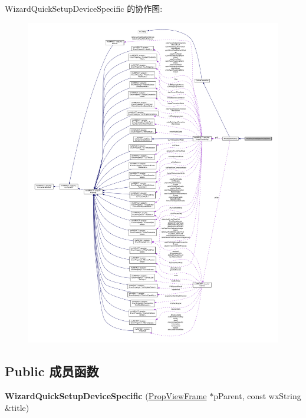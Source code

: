 Wizard\+Quick\+Setup\+Device\+Specific 的协作图\+:
\nopagebreak
\begin{figure}[H]
\begin{center}
\leavevmode
\includegraphics[width=350pt]{class_wizard_quick_setup_device_specific__coll__graph}
\end{center}
\end{figure}
\subsection*{Public 成员函数}
\begin{DoxyCompactItemize}
\item 
\hypertarget{class_wizard_quick_setup_device_specific_ac185ef76c78281263e8f45e7d05972cf}{{\bfseries Wizard\+Quick\+Setup\+Device\+Specific} (\hyperlink{class_prop_view_frame}{Prop\+View\+Frame} $\ast$p\+Parent, const wx\+String \&title)}\label{class_wizard_quick_setup_device_specific_ac185ef76c78281263e8f45e7d05972cf}

\end{DoxyCompactItemize}
